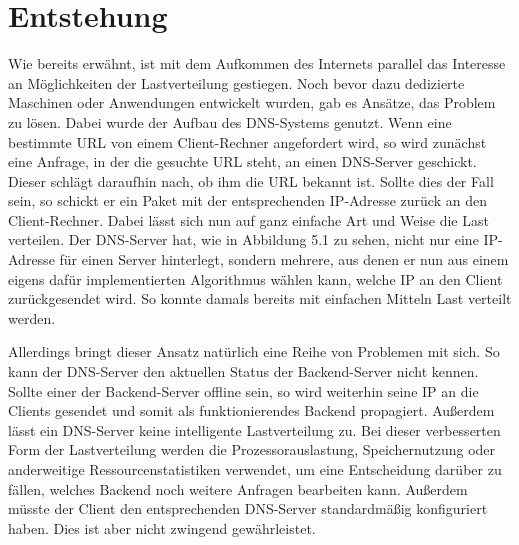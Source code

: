 \section{Entstehung}

Wie bereits erwähnt, ist mit dem Aufkommen des Internets parallel das Interesse an Möglichkeiten der Lastverteilung gestiegen. Noch bevor dazu dedizierte Maschinen oder Anwendungen entwickelt wurden, gab es Ansätze, das Problem zu lösen. Dabei wurde der Aufbau des DNS-Systems genutzt. Wenn eine bestimmte URL von einem Client-Rechner angefordert wird, so wird zunächst eine Anfrage, in der die gesuchte URL steht, an einen DNS-Server geschickt. Dieser schlägt daraufhin nach, ob ihm die URL bekannt ist. Sollte dies der Fall sein, so schickt er ein Paket mit der entsprechenden IP-Adresse zurück an den Client-Rechner. \cite{hong2006dns} Dabei lässt sich nun auf ganz einfache Art und Weise die Last verteilen. Der DNS-Server hat, wie in Abbildung 5.1 zu sehen, nicht nur eine IP-Adresse für einen Server hinterlegt, sondern mehrere, aus denen er nun aus einem eigens dafür implementierten Algorithmus wählen kann, welche IP an den Client zurückgesendet wird. So konnte damals bereits mit einfachen Mitteln Last verteilt werden. 

Allerdings bringt dieser Ansatz natürlich eine Reihe von Problemen mit sich. So kann der DNS-Server den aktuellen Status der Backend-Server nicht kennen. Sollte einer der Backend-Server offline sein, so wird weiterhin seine IP an die Clients gesendet und somit als funktionierendes Backend propagiert. Außerdem lässt ein DNS-Server keine intelligente Lastverteilung zu. Bei dieser verbesserten Form der Lastverteilung werden die Prozessorauslastung, Speichernutzung oder anderweitige Ressourcenstatistiken verwendet, um eine Entscheidung darüber zu fällen, welches Backend noch weitere Anfragen bearbeiten kann. Außerdem müsste der Client den entsprechenden DNS-Server standardmäßig konfiguriert haben. Dies ist aber nicht zwingend gewährleistet.

